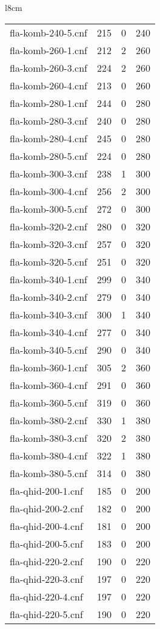 \begin{wraptable}[31]{l}{8cm}
\begin{tabular}{l| c c c }
fla-komb-240-5.cnf & 215 & 0 & 240 \\
fla-komb-260-1.cnf & 212 & 2 & 260 \\
fla-komb-260-3.cnf & 224 & 2 & 260 \\
fla-komb-260-4.cnf & 213 & 0 & 260 \\
fla-komb-280-1.cnf & 244 & 0 & 280 \\
fla-komb-280-3.cnf & 240 & 0 & 280 \\
fla-komb-280-4.cnf & 245 & 0 & 280 \\
fla-komb-280-5.cnf & 224 & 0 & 280 \\
fla-komb-300-3.cnf & 238 & 1 & 300 \\
fla-komb-300-4.cnf & 256 & 2 & 300 \\
fla-komb-300-5.cnf & 272 & 0 & 300 \\
fla-komb-320-2.cnf & 280 & 0 & 320 \\
fla-komb-320-3.cnf & 257 & 0 & 320 \\
fla-komb-320-5.cnf & 251 & 0 & 320 \\
fla-komb-340-1.cnf & 299 & 0 & 340 \\
fla-komb-340-2.cnf & 279 & 0 & 340 \\
fla-komb-340-3.cnf & 300 & 1 & 340 \\
fla-komb-340-4.cnf & 277 & 0 & 340 \\
fla-komb-340-5.cnf & 290 & 0 & 340 \\
fla-komb-360-1.cnf & 305 & 2 & 360 \\
fla-komb-360-4.cnf & 291 & 0 & 360 \\
fla-komb-360-5.cnf & 319 & 0 & 360 \\
fla-komb-380-2.cnf & 330 & 1 & 380 \\
fla-komb-380-3.cnf & 320 & 2 & 380 \\
fla-komb-380-4.cnf & 322 & 1 & 380 \\
fla-komb-380-5.cnf & 314 & 0 & 380 \\
fla-qhid-200-1.cnf & 185 & 0 & 200 \\
fla-qhid-200-2.cnf & 182 & 0 & 200 \\
fla-qhid-200-4.cnf & 181 & 0 & 200 \\
fla-qhid-200-5.cnf & 183 & 0 & 200 \\
fla-qhid-220-2.cnf & 190 & 0 & 220 \\
fla-qhid-220-3.cnf & 197 & 0 & 220 \\
fla-qhid-220-4.cnf & 197 & 0 & 220 \\
fla-qhid-220-5.cnf & 190 & 0 & 220 \\

\end{tabular}
\end{wraptable}
